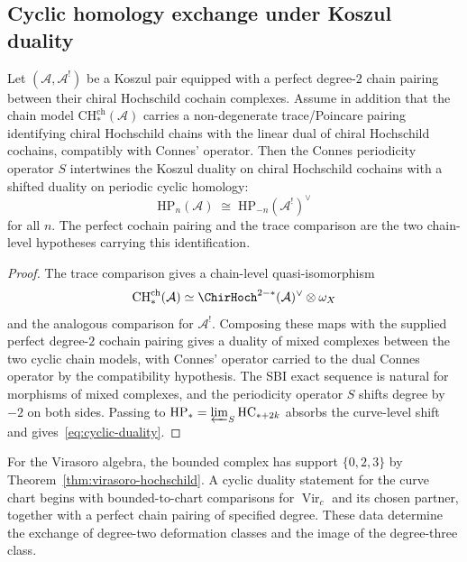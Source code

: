 \subsection{Cyclic homology exchange under Koszul duality}

\begin{corollary}\label{cor:cyclic-homology-duality}
Let $(\mathcal{A}, \mathcal{A}^!)$ be a Koszul pair equipped with a
perfect degree-$2$ chain pairing between their chiral Hochschild
cochain complexes.  Assume in addition that the chain model
$\mathrm{CH}^{\mathrm{ch}}_*(\mathcal A)$ carries a non-degenerate
trace/Poincare pairing identifying chiral Hochschild chains with the
linear dual of chiral Hochschild cochains, compatibly with Connes'
operator. Then the Connes periodicity operator
$S$ intertwines the Koszul duality on chiral Hochschild cochains with
a shifted duality on periodic cyclic homology:
\begin{equation}\label{eq:cyclic-duality}
\mathrm{HP}_n(\mathcal{A}) \;\cong\; \mathrm{HP}_{-n}(\mathcal{A}^!)^{\vee}
\end{equation}
for all $n$.  The perfect cochain pairing and the trace comparison are
the two chain-level hypotheses carrying this identification.
\end{corollary}

\begin{proof}
The trace comparison gives a chain-level quasi-isomorphism
\[
 \mathrm{CH}^{\mathrm{ch}}_*(\mathcal A)
 \simeq
 \ChirHoch^{2-*}(\mathcal A)^\vee\otimes\omega_X
\]
and the analogous comparison for $\mathcal A^!$.  Composing these
maps with the supplied perfect degree-$2$ cochain pairing gives a
duality of mixed complexes
between the two cyclic chain models, with Connes' operator carried to
the dual Connes operator by the compatibility hypothesis. The SBI
exact sequence is natural for morphisms of mixed complexes, and the
periodicity operator $S$ shifts degree by~$-2$ on both sides. Passing
to
$\mathrm{HP}_*=\varprojlim_S\mathrm{HC}_{*+2k}$ absorbs the
curve-level shift and gives~\eqref{eq:cyclic-duality}.
\end{proof}

\begin{remark}\label{rem:cyclic-koszul-virasoro}
For the Virasoro algebra, the bounded complex has support
$\{0,2,3\}$ by Theorem~\ref{thm:virasoro-hochschild}.  A cyclic
duality statement for the curve chart begins with bounded-to-chart
comparisons for $\operatorname{Vir}_c$ and its chosen partner,
together with a perfect chain pairing of specified degree.  These
data determine the exchange of degree-two deformation classes and the
image of the degree-three class.
\end{remark}

